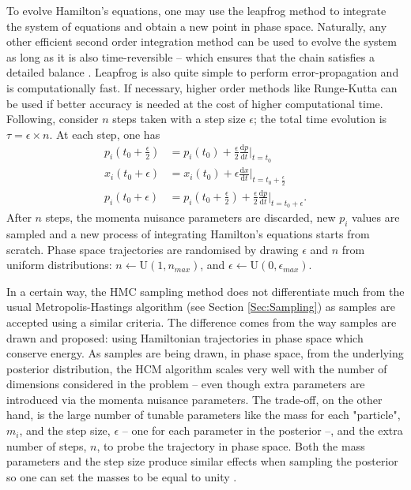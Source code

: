 \qquad To evolve Hamilton's equations, one may use the leapfrog method \citep{Neal1996,SreeThesis,2013-GuidedHamiltonian} to integrate the system of equations and obtain a new point in phase space. Naturally, any other efficient second order integration method can be used to evolve the system as long as it is also time-reversible -- which ensures that the chain satisfies a detailed balance \citep{2013-GuidedHamiltonian}. Leapfrog is also quite simple to perform error-propagation and is computationally fast. If necessary, higher order methods like Runge-Kutta can be used if better accuracy is needed at the cost of higher computational time. Following, consider $n$ steps taken with a step size $\epsilon$; the total time evolution is $\tau = \epsilon\times n$. At each step, one has
\begin{align}
\label{eqn::ch1_leap_forg_scalar_1}
p_i\left(t_0+\frac{\epsilon}{2}\right) & = p_i(t_0)+\frac{\epsilon}{2}\frac{\mathrm{d}p}{\mathrm{d}t}\Big|_{t=t_0} \\
\label{eqn::ch1_leap_forg_scalar_2}
x_i(t_0+\epsilon) &= x_i(t_0)+\epsilon\frac{\mathrm{d}x}{\mathrm{d}t}\Big|_{t=t_0+\frac{\epsilon}{2} }\\
\label{eqn::ch1_leap_forg_scalar_3}
p_i(t_0+\epsilon) & = p_i\left(t_0+\frac{\epsilon}{2}\right)+\frac{\epsilon}{2}\frac{\mathrm{d}p}{\mathrm{d}t}\Big|_{t=t_0+\epsilon}.
\end{align}
After $n$ steps, the momenta nuisance parameters are discarded, new $p_i$ values are sampled and a new process of integrating Hamilton's equations starts from scratch. Phase space trajectories are randomised by drawing $\epsilon$ and $n$ from uniform distributions: $ n \leftarrow \mathrm{U}(1,n_{max})$, and $\epsilon \leftarrow \mathrm{U}(0,\epsilon_{max})$.

\qquad In a certain way, the HMC sampling method does not differentiate much from the usual Metropolis-Hastings algorithm (see Section \ref{Sec:Sampling}) as samples are accepted using a similar criteria. The difference comes from the way samples are drawn and proposed: using Hamiltonian trajectories in phase space which conserve energy. As samples are being drawn, in phase space, from the underlying posterior distribution, the HCM algorithm scales very well with the number of dimensions considered in the problem -- even though extra parameters are introduced via the momenta nuisance parameters. The trade-off, on the other hand, is the large number of tunable parameters like the mass for each "particle", $m_i$, and the step size, $\epsilon$ -- one for each parameter in the posterior --, and the extra number of steps, $n$, to probe the trajectory in phase space. Both the mass parameters and the step size produce similar effects when sampling the posterior so one can set the masses to be equal to unity \citep{Neal1996}. 

